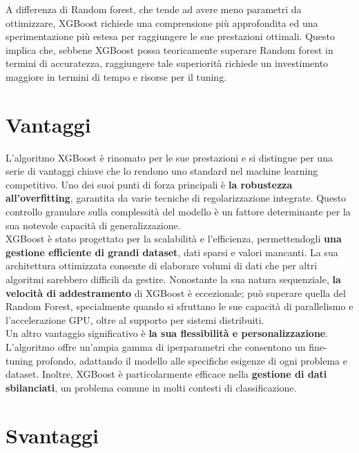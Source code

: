 \documentclass[a4paper,12pt]{report}
\begin{document}
	A differenza di Random forest, che tende ad avere meno parametri da ottimizzare, XGBoost richiede una comprensione più approfondita ed una sperimentazione più estesa per raggiungere le sue prestazioni ottimali. Questo implica che, sebbene XGBoost possa teoricamente superare Random forest in termini di accuratezza, raggiungere tale superiorità richiede un investimento maggiore in termini di tempo e risorse per il tuning.
	
	\section{Vantaggi}
	
	L'algoritmo XGBoost è rinomato per le sue prestazioni e si distingue per una serie di vantaggi chiave che lo rendono uno standard nel machine learning competitivo. Uno dei suoi punti di forza principali è \textbf{la robustezza all'overfitting}, garantita da varie tecniche di regolarizzazione integrate. Questo controllo granulare sulla complessità del modello è un fattore determinante per la sua notevole capacità di generalizzazione. \\
	XGBoost è stato progettato per la scalabilità e l'efficienza, permettendogli \textbf{una gestione efficiente di grandi dataset}, dati sparsi e valori mancanti. La sua architettura ottimizzata consente di elaborare volumi di dati che per altri algoritmi sarebbero difficili da gestire. Nonostante la sua natura sequenziale, \textbf{la velocità di addestramento} di XGBoost è eccezionale; può superare quella del Random Forest, specialmente quando si sfruttano le sue capacità di parallelismo e l'accelerazione GPU, oltre al supporto per sistemi distribuiti. \\
	Un altro vantaggio significativo è \textbf{la sua flessibilità e personalizzazione}. L'algoritmo offre un'ampia gamma di iperparametri che consentono un fine-tuning profondo, adattando il modello alle specifiche esigenze di ogni problema e dataset. Inoltre, XGBoost è particolarmente efficace nella \textbf{gestione di dati sbilanciati}, un problema comune in molti contesti di classificazione.
	
	\section{Svantaggi}
	
\end{document}
